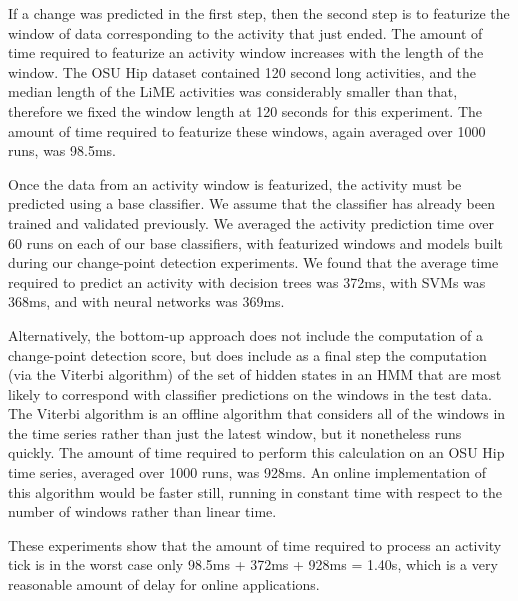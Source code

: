 If a change was predicted in the first step, then the second step is to
featurize the window of data corresponding to the activity that just ended.
The amount of time required to featurize an activity window increases with the
length of the window. The OSU Hip dataset contained 120 second long activities,
and the median length of the LiME activities was considerably smaller than that,
therefore we fixed the window length at 120 seconds for this experiment. The
amount of time required to featurize these windows, again averaged over 1000 runs,
was 98.5ms.

Once the data from an activity window is featurized, the activity must be
predicted using a base classifier. We assume that the classifier has already
been trained and validated previously. We averaged the activity prediction time
over 60 runs on each of our base classifiers, with featurized windows and models
built during our change-point detection experiments. We found that the average
time required to predict an activity with decision trees was 372ms, with
SVMs was 368ms, and with neural networks was 369ms.

Alternatively, the bottom-up approach does not include the computation of a
change-point detection score, but does include as a final step the computation
(via the Viterbi algorithm) of the set of hidden states in an HMM that are most
likely to correspond with classifier predictions on the windows in the test data. The Viterbi algorithm is an offline
algorithm that considers all of the windows in the time series rather than just
the latest window, but it nonetheless runs quickly. The amount of time required to perform this
calculation on an OSU Hip time series, averaged over 1000 runs, was 928ms. An
online implementation of this algorithm would be faster still, running
in constant time with respect to the number of windows rather
than linear time.

These experiments show that the amount of time required to process an activity
tick is in the worst case only 98.5ms + 372ms + 928ms = 1.40s, which is a very reasonable amount of delay
for online applications.
